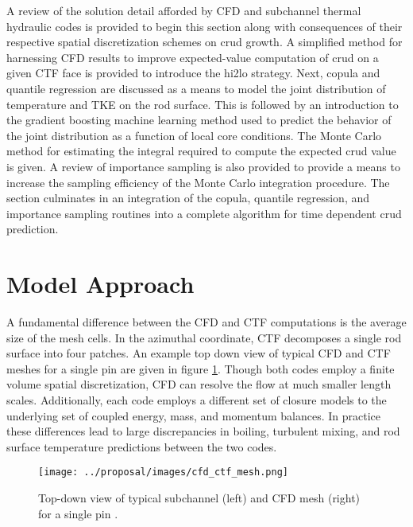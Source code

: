 
A review of the solution detail afforded by CFD and subchannel thermal hydraulic codes is provided to begin this section along with consequences of their respective spatial discretization schemes on crud growth.  A simplified method for harnessing CFD results to improve expected-value computation of crud on a given CTF face is provided to introduce the hi2lo strategy.  Next, copula and quantile regression are discussed as a means to model the joint distribution of temperature and TKE on the rod surface.   This is followed by an introduction to the gradient boosting machine learning method used to predict the behavior of the joint distribution as a function of local core conditions.  The Monte Carlo method for estimating the integral required to compute the expected crud value is given.  A review of importance sampling is also provided to provide a means to increase the sampling efficiency of the Monte Carlo integration procedure.
The section culminates in an integration of the copula, quantile regression, and importance sampling routines into a complete algorithm for time dependent crud prediction.

\section{Model Approach}

A fundamental difference between the CFD and CTF computations is the average size of the mesh cells.  In the azimuthal coordinate, CTF decomposes a single rod surface into four patches.  An example top down view of typical CFD and CTF meshes for a single pin are given in figure \ref{fig:cfd_ctf_mesh}.  Though both codes employ a finite volume spatial discretization, CFD can resolve the flow at much smaller length scales.  Additionally, each code employs a different set of closure models to the underlying set of coupled energy, mass, and momentum balances.  In practice these differences lead to large discrepancies in boiling, turbulent mixing, and rod surface temperature predictions between the two codes.
 

\begin{figure}[!htbp]
    \centering
    \texttt{[image: ../proposal/images/cfd\_ctf\_mesh.png]}
    \caption[Top-down view of typical subchannel and CFD meshes]{Top-down view of typical subchannel (left) and CFD mesh (right) for a single pin \cite{salko12}.}
    \label{fig:cfd_ctf_mesh}
\end{figure}

